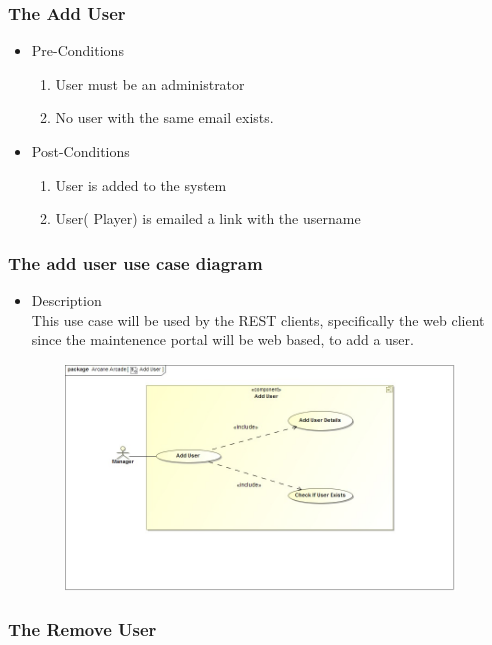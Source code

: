 \documentclass[english]{article}
\begin{document}
		
		\subsubsection{The Add User}
		
			\begin{itemize}
	
		
		\item Pre-Conditions
			\begin{enumerate}
				\item User must be an administrator
				\item No user with the same email exists.
			\end{enumerate}
		\item Post-Conditions
			\begin{enumerate}
			\item User is added to the system
			\item User( Player) is emailed a link with the username
						
			\end{enumerate}
	

\end{itemize}
		
		
		\subsubsection* {The add user use case diagram}
		\begin{itemize}
			\item Description\\
			This use case will be used by the REST clients, specifically the web client since the maintenence portal will be web based, to add a user.
		\end{itemize}
		\includegraphics[width=14cm,height=6cm,keepaspectratio]{addUser.jpg}
		
		
		\subsubsection{The Remove User}
		
\end{document}
